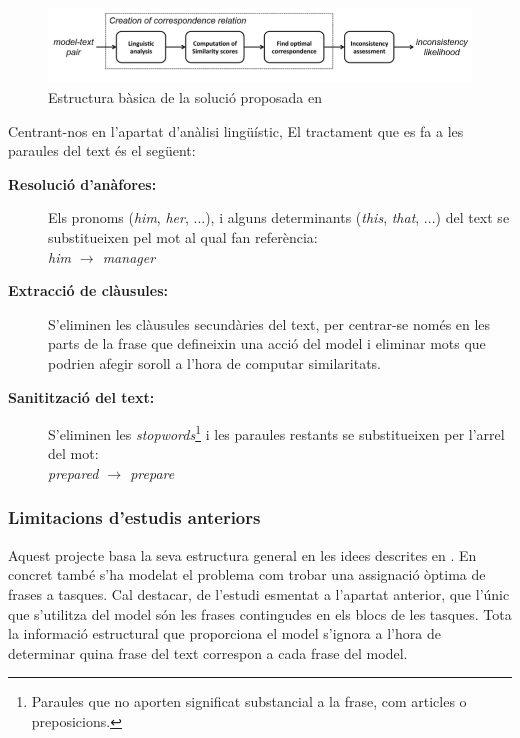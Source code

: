 \documentclass[10pt,a4paper]{article}
\begin{document}
\begin{figure}[bth]
    \centering
    \includegraphics [width=\textwidth]{el_paper_fig.png}
    \caption{Estructura bàsica de la solució proposada en \cite{el_paper}}
    \label{fig:el_paper_fig}
\end{figure}

Centrant-nos en l'apartat d'anàlisi lingüístic, El tractament que es fa a les paraules del text és el següent:

\begin{description}
\item[\textbf{Resolució d'anàfores:}] Els pronoms (\emph{him}, \emph{her}, ...), i alguns determinants (\emph{this}, \emph{that}, ...) del text se substitueixen pel mot al qual fan referència:\\ \emph{him $\rightarrow$ manager}
\item[\textbf{Extracció de clàusules:}] S'eliminen les clàusules secundàries del text, per centrar-se només en les parts de la frase que defineixin una acció del model i eliminar mots que podrien afegir soroll a l'hora de computar similaritats.
\item[\textbf{Sanitització del text:}] S'eliminen les \emph{stopwords}\footnote{Paraules que no aporten significat substancial a la frase, com articles o preposicions.} i les paraules restants se substitueixen per l'arrel del mot:\\ \emph{prepared $\rightarrow$ prepare}

\end{description}

\subsubsection{Limitacions d'estudis anteriors}

Aquest projecte basa la seva estructura general en les idees descrites en \cite{el_paper}. En concret també s'ha modelat el problema com trobar una assignació òptima de frases a tasques.  Cal destacar, de l'estudi esmentat a l'apartat anterior, que l'únic que s'utilitza del model són les frases contingudes en els blocs de les tasques. Tota la informació estructural que proporciona el model s'ignora a l'hora de determinar quina frase del text correspon a cada frase del model. 
\end{document}
